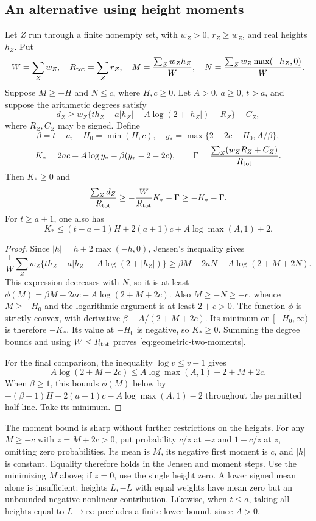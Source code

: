 \subsection{An alternative using height moments}

\begin{proposition}
\label{geometric-two-moments}
Let $Z$ run through a finite nonempty set, with $w_Z>0$, $r_Z\ge w_Z$,
and real heights $h_Z$. Put
\[
 W=\sum_Zw_Z,\quad R_{\rm tot}=\sum_Zr_Z,\quad
 M=\frac{\sum_Zw_Zh_Z}{W},\quad
 N=\frac{\sum_Zw_Z\max(-h_Z,0)}{W}.
\]
Suppose $M\ge-H$ and $N\le c$, where $H,c\ge0$. Let $A>0$,
$a\ge0$, $t>a$, and suppose the arithmetic degrees satisfy
\[
 d_Z\ge w_Z\{t h_Z-a|h_Z|-A\log(2+|h_Z|)-R_Z\}-C_Z,
\]
where $R_Z,C_Z$ may be signed. Define
\[
 \beta=t-a,\quad H_0=\min(H,c),\quad
 y_*=\max\{2+2c-H_0,A/\beta\},
\]
\[
 K_*=2ac+A\log y_*-\beta(y_*-2-2c),\qquad
 \Gamma=\frac{\sum_Z(w_ZR_Z+C_Z)}{R_{\rm tot}}.
\]
Then $K_*\ge0$ and
\begin{equation}\label{eq:geometric-two-moments}
 \frac{\sum_Zd_Z}{R_{\rm tot}}
       \ge-\frac{W}{R_{\rm tot}}K_*-\Gamma
       \ge-K_*-\Gamma.
\end{equation}
For $t\ge a+1$, one also has
\[
 K_*\le (t-a-1)H+2(a+1)c+A\log\max(A,1)+2.
\]
\end{proposition}
\begin{proof}
Since $|h|=h+2\max(-h,0)$, Jensen's inequality gives
\[
 \frac1W\sum_Zw_Z
  \{t h_Z-a|h_Z|-A\log(2+|h_Z|)\}
 \ge\beta M-2aN-A\log(2+M+2N).
\]
This expression decreases with $N$, so it is at least
$\phi(M)=\beta M-2ac-A\log(2+M+2c)$. Also
$M\ge-N\ge-c$, whence $M\ge-H_0$ and the logarithmic argument is
at least $2+c>0$. The function $\phi$ is strictly convex, with derivative
$\beta-A/(2+M+2c)$. Its minimum on $[-H_0,\infty)$ is therefore
$-K_*$. Its value at $-H_0$ is negative, so $K_*\ge0$.
Summing the degree bounds and using $W\le R_{\rm tot}$ proves
\eqref{eq:geometric-two-moments}.

For the final comparison, the inequality $\log v\le v-1$ gives
\[
 A\log(2+M+2c)\le A\log\max(A,1)+2+M+2c.
\]
When $\beta\ge1$, this bounds $\phi(M)$ below by
$-(\beta-1)H-2(a+1)c-A\log\max(A,1)-2$ throughout the permitted
half-line. Take its minimum.
\end{proof}

The moment bound is sharp without further restrictions on the heights.
For any $M\ge-c$ with $z=M+2c>0$, put probability $c/z$ at $-z$
and $1-c/z$ at $z$, omitting zero probabilities. Its mean is $M$,
its negative first moment is $c$, and $|h|$ is constant. Equality
therefore holds in the Jensen and moment steps. Use the minimizing
$M$ above; if $z=0$, use the single height zero.
A lower signed mean alone is insufficient: heights $L,-L$ with equal
weights have mean zero but an unbounded negative nonlinear contribution.
Likewise, when $t\le a$, taking all heights equal to $L\to\infty$
precludes a finite lower bound, since $A>0$.

